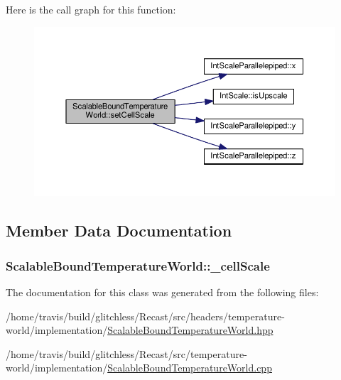 Here is the call graph for this function\-:
\nopagebreak
\begin{figure}[H]
\begin{center}
\leavevmode
\includegraphics[width=350pt]{class_scalable_bound_temperature_world_addf3187d106391375b4453614a84563b_cgraph}
\end{center}
\end{figure}




\subsection{Member Data Documentation}
\hypertarget{class_scalable_bound_temperature_world_a3ad7a326006a4abbb1c7b64b4bf4d791}{
\subsubsection[{\-\_\-cell\-Scale}]{ Scalable\-Bound\-Temperature\-World\-::\-\_\-cell\-Scale\hspace{0.3cm}{\ttfamily [protected]}}}\label{class_scalable_bound_temperature_world_a3ad7a326006a4abbb1c7b64b4bf4d791}


The documentation for this class was generated from the following files\-:\begin{DoxyCompactItemize}
\item 
/home/travis/build/glitchless/\-Recast/src/headers/temperature-\/world/implementation/\hyperlink{_scalable_bound_temperature_world_8hpp}{Scalable\-Bound\-Temperature\-World.\-hpp}\item 
/home/travis/build/glitchless/\-Recast/src/temperature-\/world/implementation/\hyperlink{_scalable_bound_temperature_world_8cpp}{Scalable\-Bound\-Temperature\-World.\-cpp}\end{DoxyCompactItemize}
